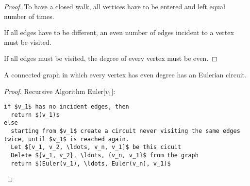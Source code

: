 \begin{proof}
  To have a closed walk, all vertices have to be entered and left equal number of times.
  
  If all edges have to be different, an even number of edges incident to a vertex must be visited. 
  
  If all edges must be visited, the degree of every vertex must be even.
\end{proof}

\begin{thm}
  A connected graph in which every vertex has even degree has an Eulerian circuit.
\end{thm}

\begin{proof}
  Recursive Algorithm Euler[$v_1$]:
  \begin{lstlisting}
if $v_1$ has no incident edges, then
  return $(v_1)$
else
  starting from $v_1$ create a circuit never visiting the same edges twice, until $v_1$ is reached again.
  Let $[v_1, v_2, \ldots, v_n, v_1]$ be this cicuit
  Delete ${v_1, v_2}, \ldots, {v_n, v_1}$ from the graph
  return $(Euler(v_1), \ldots, Euler(v_n), v_1)$
  \end{lstlisting}
\end{proof}
